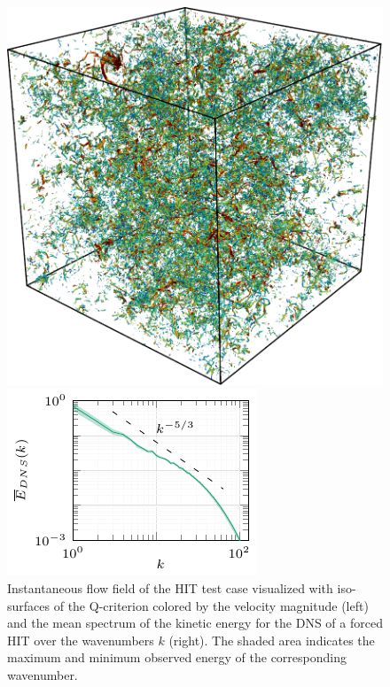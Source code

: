 \begin{figure}
  \begin{minipage}[t]{0.443\linewidth}
    \includegraphics[width=\linewidth]{./fig/HIT.pdf}%
  \end{minipage}
  \hfill
  \begin{minipage}[t]{0.53\linewidth}
    \includegraphics[width=\linewidth]{./tikz_double_column/draft-figure0.pdf}%
  \end{minipage}
  \caption{Instantaneous flow field of the HIT test case visualized with iso-surfaces of the Q-criterion colored by the velocity magnitude (left) and the mean spectrum of the kinetic energy for the DNS of a forced HIT over the wavenumbers $k$ (right). The shaded area indicates the maximum and minimum observed energy of the corresponding wavenumber.}
  \label{fig:HIT}
\end{figure}

